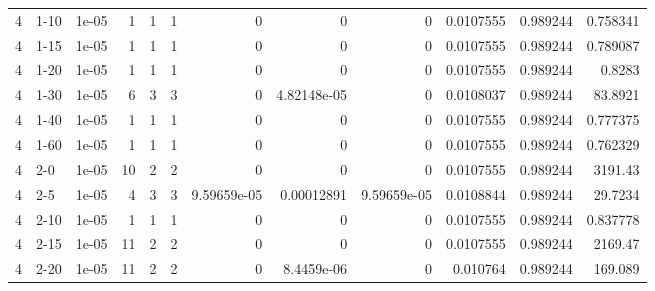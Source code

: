 \begin{tabular}{rlrrrrrrrrrr}
     4 & 1-10   &      1e-05 &           1 &                 1 &                 1 &     0           &     0           &      0           &        0.0107555 &               0.989244 &           0.758341 \\
     4 & 1-15   &      1e-05 &           1 &                 1 &                 1 &     0           &     0           &      0           &        0.0107555 &               0.989244 &           0.789087 \\
     4 & 1-20   &      1e-05 &           1 &                 1 &                 1 &     0           &     0           &      0           &        0.0107555 &               0.989244 &           0.8283   \\
     4 & 1-30   &      1e-05 &           6 &                 3 &                 3 &     0           &     4.82148e-05 &      0           &        0.0108037 &               0.989244 &          83.8921   \\
     4 & 1-40   &      1e-05 &           1 &                 1 &                 1 &     0           &     0           &      0           &        0.0107555 &               0.989244 &           0.777375 \\
     4 & 1-60   &      1e-05 &           1 &                 1 &                 1 &     0           &     0           &      0           &        0.0107555 &               0.989244 &           0.762329 \\
     4 & 2-0    &      1e-05 &          10 &                 2 &                 2 &     0           &     0           &      0           &        0.0107555 &               0.989244 &        3191.43     \\
     4 & 2-5    &      1e-05 &           4 &                 3 &                 3 &     9.59659e-05 &     0.00012891  &      9.59659e-05 &        0.0108844 &               0.989244 &          29.7234   \\
     4 & 2-10   &      1e-05 &           1 &                 1 &                 1 &     0           &     0           &      0           &        0.0107555 &               0.989244 &           0.837778 \\
     4 & 2-15   &      1e-05 &          11 &                 2 &                 2 &     0           &     0           &      0           &        0.0107555 &               0.989244 &        2169.47     \\
     4 & 2-20   &      1e-05 &          11 &                 2 &                 2 &     0           &     8.4459e-06  &      0           &        0.010764  &               0.989244 &         169.089    \\

\end{tabular}
